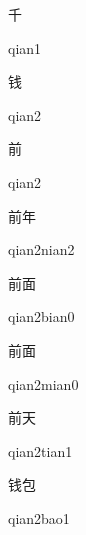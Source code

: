 \begin{multicols*}{2}
\begin{verbete}[qian1]{千}
\begin{pronuncia}{qian1}
\end{pronuncia}
\end{verbete}

\begin{verbete}[qian2]{钱}
\begin{pronuncia}{qian2}
\end{pronuncia}
\end{verbete}

\begin{verbete}[qian2]{前}
\begin{pronuncia}{qian2}
\end{pronuncia}
\end{verbete}

\begin{verbete}{前年}
\begin{pronuncia}{qian2nian2}
\end{pronuncia}
\end{verbete}

\begin{verbete}{前面}
\begin{pronuncia}{qian2bian0}
\end{pronuncia}
\end{verbete}

\begin{verbete}{前面}
\begin{pronuncia}{qian2mian0}
\end{pronuncia}
\end{verbete}

\begin{verbete}{前天}
\begin{pronuncia}{qian2tian1}
\end{pronuncia}
\end{verbete}

\begin{verbete}{钱包}
\begin{pronuncia}{qian2bao1}
\end{pronuncia}
\end{verbete}


\end{multicols*}
